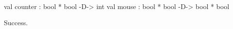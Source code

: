 \runverbatimtrue
{}
\begin{RunVerbatimMsg}
val counter : bool * bool -D-> int
val mouse : bool * bool -D-> bool * bool
\end{RunVerbatimMsg}
\begin{RunVerbatimErr}
Success.
\end{RunVerbatimErr}
